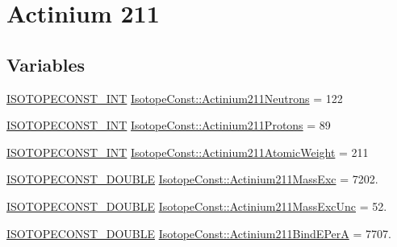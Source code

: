 \hypertarget{group___isotope_const-_actinium-_ac211}{}\section{Actinium 211}
\label{group___isotope_const-_actinium-_ac211}
\subsection*{Variables}
\begin{DoxyCompactItemize}
\item 
\mbox{\hyperlink{group___isotope_const-_macros_ga5f18360b3e99483a35c32d789e62621c}{I\+S\+O\+T\+O\+P\+E\+C\+O\+N\+S\+T\+\_\+\+I\+NT}} \mbox{\hyperlink{group___isotope_const-_actinium-_ac211_ga61dfe19df2cd87b64e455d8229a1cc10}{Isotope\+Const\+::\+Actinium211\+Neutrons}} = 122
\item 
\mbox{\hyperlink{group___isotope_const-_macros_ga5f18360b3e99483a35c32d789e62621c}{I\+S\+O\+T\+O\+P\+E\+C\+O\+N\+S\+T\+\_\+\+I\+NT}} \mbox{\hyperlink{group___isotope_const-_actinium-_ac211_ga5edd79db0e963c6ee5753a287bf7f771}{Isotope\+Const\+::\+Actinium211\+Protons}} = 89
\item 
\mbox{\hyperlink{group___isotope_const-_macros_ga5f18360b3e99483a35c32d789e62621c}{I\+S\+O\+T\+O\+P\+E\+C\+O\+N\+S\+T\+\_\+\+I\+NT}} \mbox{\hyperlink{group___isotope_const-_actinium-_ac211_ga280210a46c083e55d196502427d090c4}{Isotope\+Const\+::\+Actinium211\+Atomic\+Weight}} = 211
\item 
\mbox{\hyperlink{group___isotope_const-_macros_ga8f45a7272ce02c0b4c65c44636ed719a}{I\+S\+O\+T\+O\+P\+E\+C\+O\+N\+S\+T\+\_\+\+D\+O\+U\+B\+LE}} \mbox{\hyperlink{group___isotope_const-_actinium-_ac211_ga455853a90ed766a7334312c4232b043b}{Isotope\+Const\+::\+Actinium211\+Mass\+Exc}} = 7202.
\item 
\mbox{\hyperlink{group___isotope_const-_macros_ga8f45a7272ce02c0b4c65c44636ed719a}{I\+S\+O\+T\+O\+P\+E\+C\+O\+N\+S\+T\+\_\+\+D\+O\+U\+B\+LE}} \mbox{\hyperlink{group___isotope_const-_actinium-_ac211_ga8dce62008756bbb664a58751513730d4}{Isotope\+Const\+::\+Actinium211\+Mass\+Exc\+Unc}} = 52.
\item 
\mbox{\hyperlink{group___isotope_const-_macros_ga8f45a7272ce02c0b4c65c44636ed719a}{I\+S\+O\+T\+O\+P\+E\+C\+O\+N\+S\+T\+\_\+\+D\+O\+U\+B\+LE}} \mbox{\hyperlink{group___isotope_const-_actinium-_ac211_gaadb120e199496a5e4bedcc378813c9f2}{Isotope\+Const\+::\+Actinium211\+Bind\+E\+PerA}} = 7707.
\item 

\end{DoxyCompactItemize}
